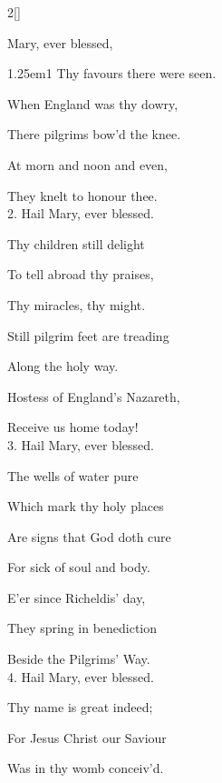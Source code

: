 \begin{paracol}{2}[]
\sloppy

\vspace{-1\baselineskip}

\firstEvensong


\firstEvensongHymn
{} Mary, ever blessed,



\begin{hangparas}{1.25em}{1}
Thy favours there were seen.

When England was thy dowry,

There pilgrims bow'd the knee.

At morn and noon and even,

They knelt to honour thee.\\

2. Hail Mary, ever blessed.

Thy children still delight

To tell abroad thy praises,

Thy miracles, thy might.

Still pilgrim feet are treading

Along the holy way.

Hostess of England's Nazareth,

Receive us home today!\\

3. Hail Mary, ever blessed.

The wells of water pure

Which mark thy holy places

Are signs that God doth cure

For sick of soul and body.

E’er since Richeldis' day,

They spring in benediction

Beside the Pilgrims' Way.\\

4. Hail Mary, ever blessed.

Thy name is great indeed;

For Jesus Christ our Saviour

Was in thy womb conceiv'd.


\end{hangparas}
\end{paracol}
